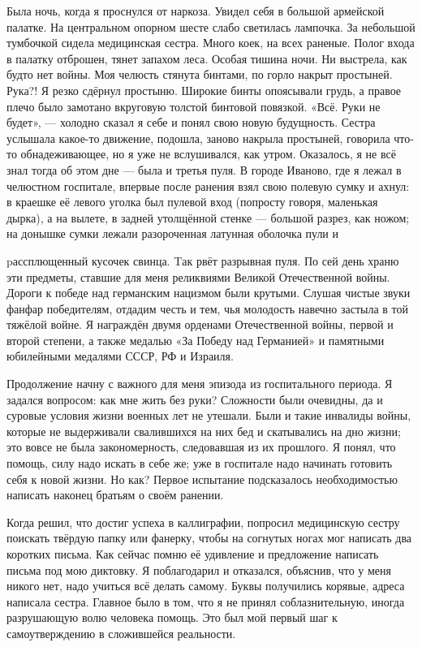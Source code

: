 \label{13-1}
Была ночь, когда я проснулся от наркоза. Увидел себя в большой армейской палатке. На центральном опорном шесте слабо светилась лампочка. За небольшой тумбочкой сидела медицинская сестра. Много коек, на всех раненые. Полог входа в палатку отброшен, тянет запахом леса. Особая тишина ночи. Ни выстрела, как будто нет войны. Моя челюсть стянута бинтами, по горло накрыт простыней. Рука?! Я резко сдёрнул простыню. Широкие бинты опоясывали грудь, а правое плечо было замотано вкруговую толстой бинтовой повязкой. «Всё. Руки не будет», — холодно сказал я себе и понял свою новую будущность. Сестра услышала какое-то движение, подошла, заново накрыла простыней, говорила что-то обнадеживающее, но я уже не вслушивался, как утром. Оказалось, я не всё знал тогда об этом дне — была и третья пуля. В городе Иваново, где я лежал в челюстном госпитале, впервые после ранения взял свою полевую сумку и ахнул: в краешке её левого уголка был пулевой вход (попросту говоря, маленькая дырка), а на вылете, в задней утолщённой стенке — большой разрез, как ножом; на донышке сумки лежали разороченная латунная оболочка пули и

\label{14-1}
pассплющенный кусочек свинца. Tак рвёт разрывная пуля. По сей день храню эти предметы, ставшие для меня реликвиями Великой Отечественной войны. Дороги к победе над германским нацизмом были крутыми. Слушая чистые звуки фанфар победителям, отдадим честь и тем, чья молодость навечно застыла в той тяжёлой войне. Я награждён двумя орденами Отечественной войны, первой и второй степени, а также медалью «За Победу над Германией» и памятными юбилейными медалями СССР, РФ и \mbox{Израиля.\footnotemark}

\label{14-2}

\label{14-3}
Продолжение начну с важного для меня эпизода из госпитального периода. Я задался вопросом: как мне жить без руки? Сложности были очевидны, да и суровые условия жизни военных лет не утешали. Были и такие инвалиды войны, которые не выдерживали свалившихся на них бед и скатывались на дно жизни; это вовсе не была закономерность, следовавшая из их прошлого. Я понял, что помощь, силу надо искать в себе же; уже в госпитале надо начинать готовить себя к новой жизни. Но как?
Первое испытание подсказалось необходимостью написать наконец братьям о своём ранении.

\label{15-1}
 Когда решил, что достиг успеха в каллиграфии, попросил медицинскую сестру поискать твёрдую папку или фанерку, чтобы на согнутых ногах мог написать два коротких письма. Как сейчас помню её удивление и предложение написать письма под мою диктовку. Я поблагодарил и отказался, объяснив, что у меня никого нет, надо учиться всё делать самому.
 Буквы получились корявые, адреса написала сестра. Главное было в том, что я не принял соблазнительную, иногда разрушающую волю человека помощь. Это был мой первый шаг к самоутверждению в сложившейся реальности.
